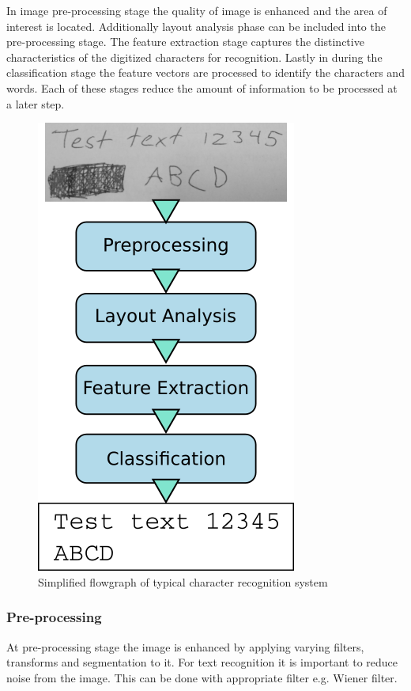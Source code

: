 \documentclass{article}
\begin{document}
    In image pre-processing stage the quality of image is enhanced and the area of interest is located. Additionally layout analysis phase can be included into the pre-processing stage. The feature extraction stage captures the distinctive characteristics of the digitized characters for recognition. Lastly in during the classification stage the feature vectors are processed to identify the characters and words. Each of these stages reduce the amount of information to be processed at a later step. \cite{Cheriet2007}
    \begin{figure}
      \centering
      \includegraphics[natwidth=324,natheight=566,scale=0.4]{flowgraph.png}
      \caption{Simplified flowgraph of typical character recognition system \label{fig:flow}
                }
    \end{figure}

      \subsubsection{Pre-processing}
        At pre-processing stage the image is enhanced by applying varying filters, transforms and segmentation to it. For text recognition it is important to reduce noise from the image. This can be done with appropriate filter e.g. Wiener filter.
\end{document}
